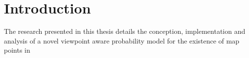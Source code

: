 \section{Introduction}

The research presented in this thesis details the conception, implementation and analysis of a novel viewpoint aware probability model for the existence of map points in 







